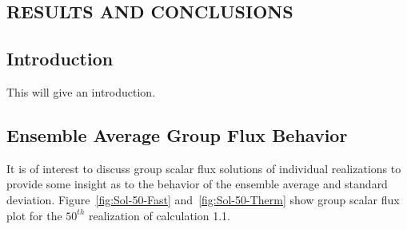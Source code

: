 
\begin{center}
\section{RESULTS AND CONCLUSIONS}
\label{sec:Results-and-Conc}
\end{center}

\aboveSubSecSkip

\subsection{Introduction}
\label{sec:Results-and-Conc-Intro}

\noindent
	\indent This will give an introduction.
			
\belowSubSecSkip

\subsection{Ensemble Average Group Flux Behavior}
\label{sec:Results-and-Conc-Flx-Bhvr}

\noindent
	\indent It is of interest to discuss group scalar flux solutions of individual realizations to
	provide some insight as to the behavior of the ensemble average and standard deviation.
	Figure~\ref{fig:Sol-50-Fast} and~\ref{fig:Sol-50-Therm} show group scalar flux plot for
	the ${50^{th}}$ realization of calculation 1.1.

